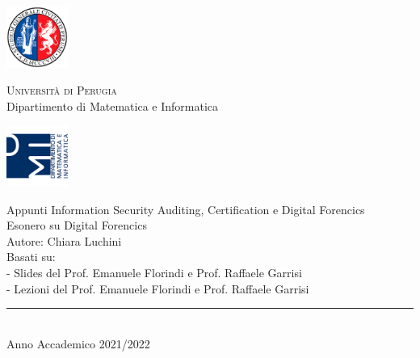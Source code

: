 
\thispagestyle{empty} %

	\noindent %
	\includegraphics[width=0.15\textwidth]{img/logoUniPg}
	\begin{minipage}[b]{0.7\textwidth}
		\centering
		{\Large{\textsc{Universit{\`a} di Perugia}}}\\
		\vspace{0.4 em}
		{\large {Dipartimento di Matematica e Informatica}}
		\vspace{0.6 em}
	\end{minipage}%
	\includegraphics[width=0.15\textwidth]{img/logoDMI}
	
	\vspace{8 em}

	\begin{center}
		

	
		{\Huge{Appunti Information Security Auditing, Certification e Digital Forencics}}\\
         \large{Esonero su Digital Forencics}\\
		\vspace{2 em}
		{\large { Autore: Chiara Luchini}}\\
		\vspace{5 em}
		{\large {Basati su:}}\\
		{\large {- Slides del Prof. Emanuele Florindi e Prof. Raffaele Garrisi}}\\
		{\large {- Lezioni del Prof. Emanuele Florindi e Prof. Raffaele Garrisi}}\\
		
	
	

		
		\vspace{6 em}
		\vfill
		
	{\rule{380pt}{.4pt}}\\
		\vspace{1.2 em}
		\large{{Anno Accademico 2021/2022}}
		
		
		
		
	\end{center}

